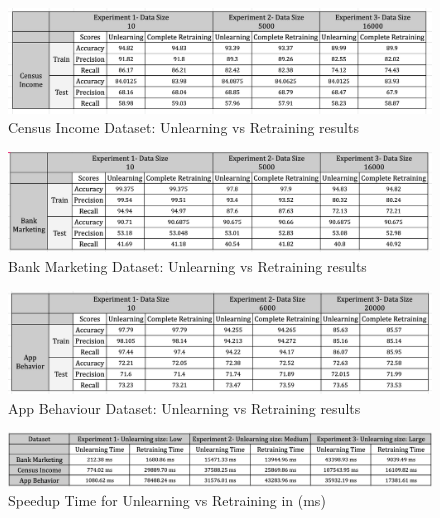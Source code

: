 \documentclass[11pt,letterpaper]{article}
\begin{document}
\begin{figure}[h]
         \centering
             \centering
             \includegraphics[width=\textwidth]{tables/Census-Income.png}
             \caption{Census Income Dataset: Unlearning vs Retraining results}
             \footnotesize
             \label{fig:censusincome-results-1}
\end{figure}

\begin{figure}[h]
         \centering
             \centering
             \includegraphics[width=\textwidth]{tables/Bank-Marketing.png}
             \caption{Bank Marketing Dataset: Unlearning vs Retraining results}
             \footnotesize
             \label{fig:bankmarketing-results-1}
\end{figure}

\begin{figure}[h]
         \centering
             \centering
             \includegraphics[width=\textwidth]{tables/App-Behaviour.png}
             \caption{App Behaviour Dataset: Unlearning vs Retraining results}
             \footnotesize
             \label{fig:appbehaviour-results-1}
\end{figure}

\begin{figure}[h]
    \centering
    \includegraphics[width=\textwidth]{tables/SpeedupTime.png}
    \caption{Speedup Time for Unlearning vs Retraining in (ms)}
    \label{fig:speeduptime}
\end{figure}
\end{document}
